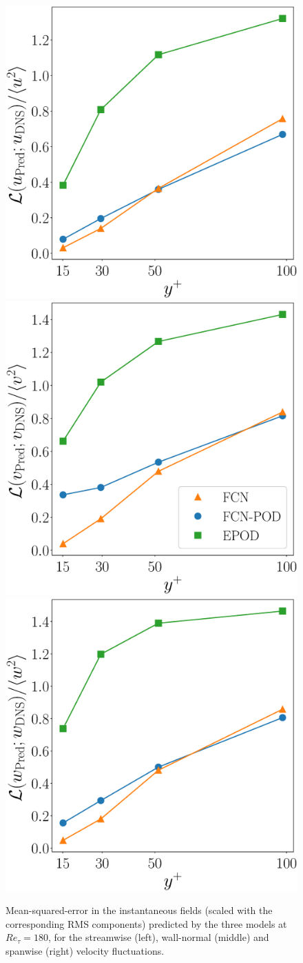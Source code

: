 \begin{figure}
\begin{center}
\includegraphics[width=.32\columnwidth]{Ret180/mse_u180_rms_scale.eps}
\includegraphics[width=.32\columnwidth]{Ret180/mse_v180_rms_scale.eps}
\includegraphics[width=.32\columnwidth]{Ret180/mse_w180_rms_scale.eps}
\end{center}
\caption{\label{fig:loss180} Mean-squared-error in the instantaneous fields (scaled with the corresponding RMS components) predicted by the three models at $Re_{\tau} = 180$, for the streamwise (left), wall-normal (middle) and spanwise (right) velocity fluctuations.}
\end{figure}

